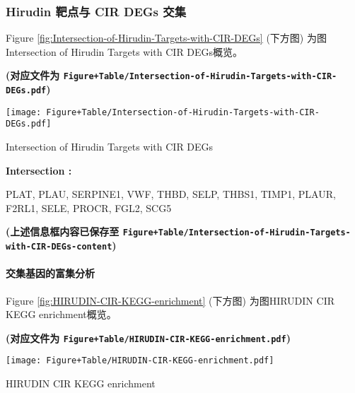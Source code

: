 \documentclass[
]{article}
\begin{document}
\hypertarget{hirudin-ux9776ux70b9ux4e0e-cir-degs-ux4ea4ux96c6}{%
\subsubsection{Hirudin 靶点与 CIR DEGs 交集}\label{hirudin-ux9776ux70b9ux4e0e-cir-degs-ux4ea4ux96c6}}

Figure \ref{fig:Intersection-of-Hirudin-Targets-with-CIR-DEGs} (下方图) 为图Intersection of Hirudin Targets with CIR DEGs概览。

\textbf{(对应文件为 \texttt{Figure+Table/Intersection-of-Hirudin-Targets-with-CIR-DEGs.pdf})}

\def\@captype{figure}
\begin{center}
\texttt{[image: Figure+Table/Intersection-of-Hirudin-Targets-with-CIR-DEGs.pdf]}
\caption{Intersection of Hirudin Targets with CIR DEGs}\label{fig:Intersection-of-Hirudin-Targets-with-CIR-DEGs}
\end{center}
\begin{center}\begin{tcolorbox}[colback=gray!10, colframe=gray!50, width=0.9\linewidth, arc=1mm, boxrule=0.5pt]
\textbf{
Intersection
:}

\vspace{0.5em}

    PLAT, PLAU, SERPINE1, VWF, THBD, SELP, THBS1, TIMP1,
PLAUR, F2RL1, SELE, PROCR, FGL2, SCG5

\vspace{2em}
\end{tcolorbox}
\end{center}

\textbf{(上述信息框内容已保存至 \texttt{Figure+Table/Intersection-of-Hirudin-Targets-with-CIR-DEGs-content})}

\hypertarget{ux4ea4ux96c6ux57faux56e0ux7684ux5bccux96c6ux5206ux6790}{%
\paragraph{交集基因的富集分析}\label{ux4ea4ux96c6ux57faux56e0ux7684ux5bccux96c6ux5206ux6790}}

Figure \ref{fig:HIRUDIN-CIR-KEGG-enrichment} (下方图) 为图HIRUDIN CIR KEGG enrichment概览。

\textbf{(对应文件为 \texttt{Figure+Table/HIRUDIN-CIR-KEGG-enrichment.pdf})}

\def\@captype{figure}
\begin{center}
\texttt{[image: Figure+Table/HIRUDIN-CIR-KEGG-enrichment.pdf]}
\caption{HIRUDIN CIR KEGG enrichment}\label{fig:HIRUDIN-CIR-KEGG-enrichment}
\end{center}
\end{document}
